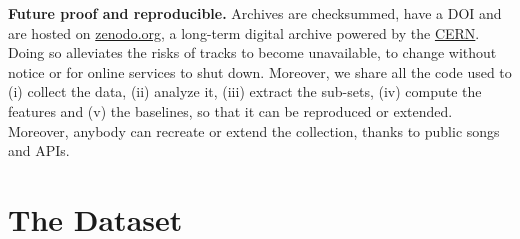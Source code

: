 \documentclass{article}
\begin{document}
\textbf{Future proof and reproducible.} Archives are checksummed, have a DOI and are hosted on \href{https://zenodo.org}{zenodo.org}, a long-term digital archive powered by the \href{https://home.cern}{CERN}. Doing so alleviates the risks of tracks to become unavailable, to change without notice or for online services to shut down.
Moreover, we share all the code used to (i) collect the data, (ii) analyze it, (iii) extract the sub-sets, (iv) compute the features and (v) the baselines, so that it can be reproduced or extended.
Moreover, anybody can recreate or extend the collection, thanks to public songs and APIs.




\section{The Dataset} %


\end{document}
